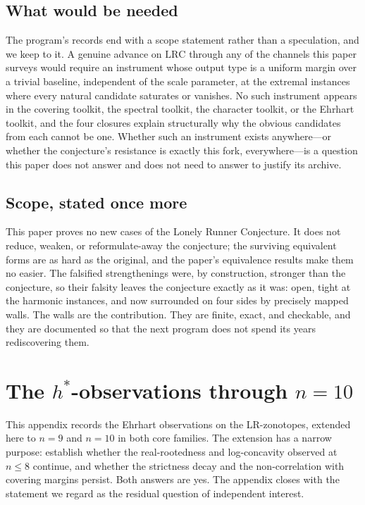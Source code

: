 \documentclass[11pt,a4paper]{article}
\numberwithin{equation}{section}
\theoremstyle{plain}
\theoremstyle{definition}
\theoremstyle{remark}
\newcommand{\lrc}{\mathrm{LRC}}
\begin{document}
\subsection{What would be needed}

The program's records end with a scope statement rather than a
speculation, and we keep to it. A genuine advance on $\lrc$ through any
of the channels this paper surveys would require an instrument whose
output type is a uniform margin over a trivial baseline, independent of
the scale parameter, at the extremal instances where every natural
candidate saturates or vanishes. No such instrument appears in the
covering toolkit, the spectral toolkit, the character toolkit, or the
Ehrhart toolkit, and the four closures explain structurally why the
obvious candidates from each cannot be one. Whether such an instrument
exists anywhere---or whether the conjecture's resistance is exactly this
fork, everywhere---is a question this paper does not answer and does
not need to answer to justify its archive.

\subsection{Scope, stated once more}

This paper proves no new cases of the Lonely Runner Conjecture. It does
not reduce, weaken, or reformulate-away the conjecture; the surviving
equivalent forms are as hard as the original, and the paper's
equivalence results make them no easier. The falsified strengthenings
were, by construction, stronger than the conjecture, so their falsity
leaves the conjecture exactly as it was: open, tight at the harmonic
instances, and now surrounded on four sides by precisely mapped walls.
The walls are the contribution. They are finite, exact, and checkable,
and they are documented so that the next program does not spend its
years rediscovering them.


\appendix
\section{The \boldmath$h^*$-observations through \boldmath$n=10$}
\label{sec:hstar}

This appendix records the Ehrhart observations on the LR-zonotopes,
extended here to $n=9$ and $n=10$ in both core families. The
extension has a narrow purpose:
establish whether the real-rootedness and log-concavity observed at
$n\le8$ continue, and whether the strictness decay and the
non-correlation with covering margins persist. Both answers are yes. The
appendix closes with the statement we regard as the residual question of
independent interest.
\end{document}
